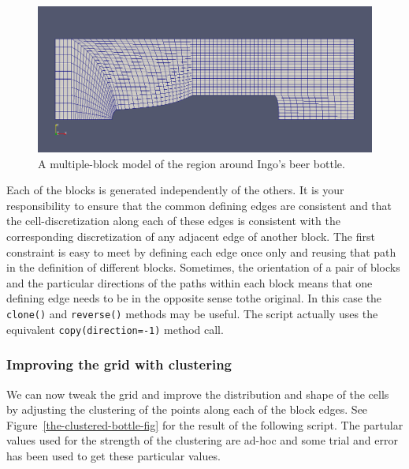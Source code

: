 \noindent
\topbar

\bottombar

\begin{figure}[htbp]
\begin{center}
\includegraphics[width=\textwidth]{../2D/beer-bottle/the_plain_bottle.png}
\end{center}
\caption{A multiple-block model of the region around Ingo's beer bottle.}
\label{the-plain-bottle-fig}
\end{figure}

\medskip
Each of the blocks is generated independently of the others.
It is your responsibility to ensure that the common defining edges are 
consistent and that the cell-discretization along each of these edges 
is consistent with the corresponding discretization of any adjacent edge 
of another block.
The first constraint is easy to meet by defining each edge once only and
reusing that path in the definition of different blocks.
Sometimes, the orientation of a pair of blocks and 
the particular directions of the paths within each block means that 
one defining edge needs to be in the opposite sense tothe original.
In this case the \texttt{clone()} and \texttt{reverse()} methods may be useful.
The script actually uses the equivalent \texttt{copy(direction=-1)} method call.

\subsubsection*{Improving the grid with clustering}
%
We can now tweak the grid and improve the distribution and shape of the cells
by adjusting the clustering of the points along each of the block edges.
See Figure~\ref{the-clustered-bottle-fig} for the result of the following script.
The partular values used for the strength of the clustering are ad-hoc and some
trial and error has been used to get these particular values.

